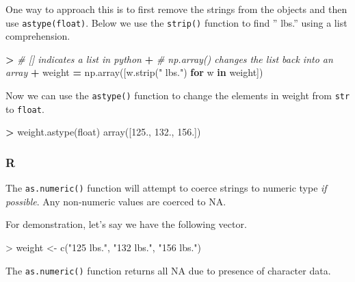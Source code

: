 \documentclass[
]{book}
\newenvironment{Shaded}{\begin{snugshade}}{\end{snugshade}}
\newcommand{\BuiltInTok}[1]{#1}
\newcommand{\CommentTok}[1]{\textcolor[rgb]{0.56,0.35,0.01}{\textit{#1}}}
\newcommand{\ControlFlowTok}[1]{\textcolor[rgb]{0.13,0.29,0.53}{\textbf{#1}}}
\newcommand{\FloatTok}[1]{\textcolor[rgb]{0.00,0.00,0.81}{#1}}
\newcommand{\FunctionTok}[1]{\textcolor[rgb]{0.00,0.00,0.00}{#1}}
\newcommand{\KeywordTok}[1]{\textcolor[rgb]{0.13,0.29,0.53}{\textbf{#1}}}
\newcommand{\NormalTok}[1]{#1}
\newcommand{\OperatorTok}[1]{\textcolor[rgb]{0.81,0.36,0.00}{\textbf{#1}}}
\newcommand{\OtherTok}[1]{\textcolor[rgb]{0.56,0.35,0.01}{#1}}
\newcommand{\SpecialCharTok}[1]{\textcolor[rgb]{0.00,0.00,0.00}{#1}}
\newcommand{\StringTok}[1]{\textcolor[rgb]{0.31,0.60,0.02}{#1}}
\begin{document}
One way to approach this is to first remove the strings from the objects and then use \texttt{astype(float)}. Below we use the \texttt{strip()} function to find '' lbs.'' using a list comprehension.

\begin{Shaded}
\begin{Highlighting}[]
\OperatorTok{\textgreater{}} \CommentTok{\# [] indicates a list in python}
\OperatorTok{+} \CommentTok{\# np.array() changes the list back into an array}
\OperatorTok{+}\NormalTok{ weight }\OperatorTok{=}\NormalTok{ np.array([w.strip(}\StringTok{" lbs."}\NormalTok{) }\ControlFlowTok{for}\NormalTok{ w }\KeywordTok{in}\NormalTok{ weight])}
\end{Highlighting}
\end{Shaded}

Now we can use the \texttt{astype()} function to change the elements in weight from \texttt{str} to \texttt{float}.

\begin{Shaded}
\begin{Highlighting}[]
\OperatorTok{\textgreater{}}\NormalTok{ weight.astype(}\BuiltInTok{float}\NormalTok{)}
\NormalTok{array([}\FloatTok{125.}\NormalTok{, }\FloatTok{132.}\NormalTok{, }\FloatTok{156.}\NormalTok{])}
\end{Highlighting}
\end{Shaded}

\hypertarget{r-19}{%
\subsubsection*{R}\label{r-19}}

The \texttt{as.numeric()} function will attempt to coerce strings to numeric type \emph{if possible}. Any non-numeric values are coerced to NA.

For demonstration, let's say we have the following vector.

\begin{Shaded}
\begin{Highlighting}[]
\SpecialCharTok{\textgreater{}}\NormalTok{ weight }\OtherTok{\textless{}{-}} \FunctionTok{c}\NormalTok{(}\StringTok{"125 lbs."}\NormalTok{, }\StringTok{"132 lbs."}\NormalTok{, }\StringTok{"156 lbs."}\NormalTok{)}
\end{Highlighting}
\end{Shaded}

The \texttt{as.numeric()} function returns all NA due to presence of character data.
\end{document}
